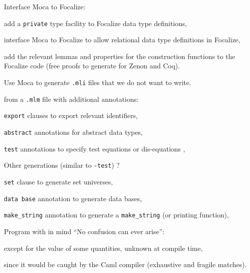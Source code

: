 Interface Moca to Focalize:

\begin{citemize}
 \item add a {\tt private} type facility to Focalize data type definitions,
 \item interface Moca to Focalize to allow relational data type definitions
 in Focalize,
 \item add the relevant lemmas and properties for the construction functions
 to the Focalize code (free proofs to generate for Zenon and Coq).
\end{citemize}


Use Moca to generate {\tt .mli} files that we do not want to write.

\begin{citemize}
  \item from a {\tt .mlm} file with additional annotations:
     \begin{citemize}
        \item {\tt export} clauses to export relevant identifiers,
        \item {\tt abstract} annotations for abstract data types,
        \item {\tt test} annotations to specify test equations or
        dis-equations ,
     \end{citemize}
  \item Other generations (similar to {\tt -test}) ?
     \begin{citemize}
        \item {\tt set} clause to generate set universes,
        \item {\tt data base} annotation to generate data bases,
        \item {\tt make\_string} annotation to generate a {\tt make\_string} (or
     printing function),
     \end{citemize}
\end{citemize}


Program with in mind ``No confusion can ever arise'':

\begin{citemize}
 \item except for the value of some quantities, unknown at compile time,
 \item since it would be caught by the Caml compiler (exhaustive and fragile matches).
\end{citemize}
